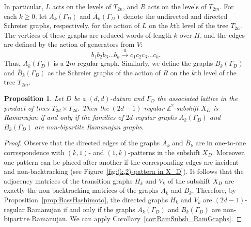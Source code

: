 \documentclass[12pt]{article}
\newtheorem{proposition}[theorem]{Proposition}
\theoremstyle{definition}
\begin{document}
In particular, $L$ acts on the levels of $T_{2n}$, and $R$ acts on the levels of $T_{2m}$. For each $k\geq 0$, let $A_k(\Gamma_D)$ and $\overline{A}_k(\Gamma_D)$ denote the undirected and directed Schreier graphs, respectively, for the action of $L$ on the $k$th level of the tree $T_{2n}$. The vertices of these graphs are reduced words of length $k$ over $H$, and the edges are defined by the action of generators from $V$:
\begin{equation}\label{eqn:edges_Ak}
b_1b_2b_3\ldots b_k \xrightarrow{a} c_1c_2c_3\ldots c_k.
\end{equation}
Thus, $A_k(\Gamma_D)$ is a $2m$-regular graph. Similarly, we define the graphs $B_k(\Gamma_D)$ and $\overline{B}_k(\Gamma_D)$ as the Schreier graphs of the action of $R$ on the $k$th level of the tree $T_{2m}$.


\begin{proposition}
Let $D$ be a $(d,d)$-datum and $\Gamma_D$ the associated lattice in the product of trees $T_{2d}\times T_{2d}$. Then the $(2d-1)$-regular $\mathbb{Z}^2$-subshift $X_D$ is Ramanujan if and only if the families of $2d$-regular graphs $A_k(\Gamma_D)$ and $B_k(\Gamma_D)$ are non-bipartite Ramanujan graphs.
\end{proposition}
\begin{proof}
Observe that the directed edges of the graphs $\overline{A}_k$ and $\overline{B}_k$ are in one-to-one correspondence with $(k,1)$- and $(1,k)$-patterns in the subshift $X_D$. Moreover, one pattern can be placed after another if the corresponding edges are incident and non-backtracking (see Figure~\ref{fig:(k,2)-pattern in X_D}).  It follows that the adjacency matrices of the transition graphs $H_k$ and $V_k$ of the subshift $X_D$ are exactly the non-backtracking matrices of the graphs $A_k$ and $B_k$. Therefore, by Proposition~\ref{prop:BassHashimoto}, the directed graphs $H_k$ and $V_k$ are $(2d-1)$-regular Ramanujan if and only if the graphs $A_k(\Gamma_D)$ and $B_k(\Gamma_D)$ are non-bipartite Ramanujan. We can apply Corollary~\ref{cor:RamSubsh_RamGraphs}.
\end{proof}
\end{document}
